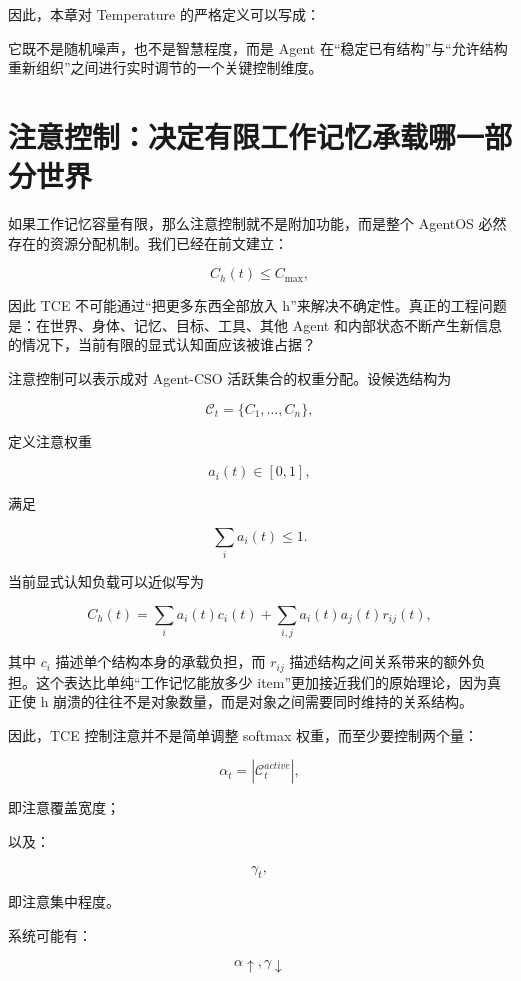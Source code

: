 因此，本章对 Temperature 的严格定义可以写成：

\begin{statementbox}
\centering
{}
\end{statementbox}

它既不是随机噪声，也不是智慧程度，而是 Agent 在“稳定已有结构”与“允许结构重新组织”之间进行实时调节的一个关键控制维度。

\section{注意控制：决定有限工作记忆承载哪一部分世界}

如果工作记忆容量有限，那么注意控制就不是附加功能，而是整个 AgentOS 必然存在的资源分配机制。我们已经在前文建立：

\[
C_h(t)\le C_{\max},
\]

因此 TCE 不可能通过“把更多东西全部放入 h”来解决不确定性。真正的工程问题是：在世界、身体、记忆、目标、工具、其他 Agent 和内部状态不断产生新信息的情况下，当前有限的显式认知面应该被谁占据？

注意控制可以表示成对 Agent-CSO 活跃集合的权重分配。设候选结构为

\[
\mathcal C_t
=
\{C_1,\ldots,C_n\},
\]

定义注意权重

\[
a_i(t)\in[0,1],
\]

满足

\[
\sum_i a_i(t)\le 1.
\]

当前显式认知负载可以近似写为

\[
C_h(t)
=
\sum_i
a_i(t)c_i(t)
+
\sum_{i,j}
a_i(t)a_j(t)r_{ij}(t),
\]

其中 $c_i$ 描述单个结构本身的承载负担，而 $r_{ij}$ 描述结构之间关系带来的额外负担。这个表达比单纯“工作记忆能放多少 item”更加接近我们的原始理论，因为真正使 h 崩溃的往往不是对象数量，而是对象之间需要同时维持的关系结构。

因此，TCE 控制注意并不是简单调整 softmax 权重，而至少要控制两个量：

\[
\alpha_t
=
|\mathcal C_t^{active}|,
\]

即注意覆盖宽度；

以及：

\[
\gamma_t,
\]

即注意集中程度。

系统可能有：

\[
\alpha\uparrow,\gamma\downarrow
\]

